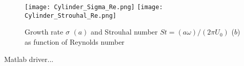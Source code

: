 \documentclass[twocolumn,10pt]{asme2ej}
\begin{document}
\begin{figure}
\texttt{[image: Cylinder\_Sigma\_Re.png]}
\texttt{[image: Cylinder\_Strouhal\_Re.png]}
\caption{Growth rate $\sigma$ $(a)$  and Strouhal number $St = (a \omega)/(2\pi U_0)$ ($b$) as function of Reynolds number}
\label{fig:SigmaOmega}
\end{figure}



 








Matlab driver...








\clearpage
\end{document}
